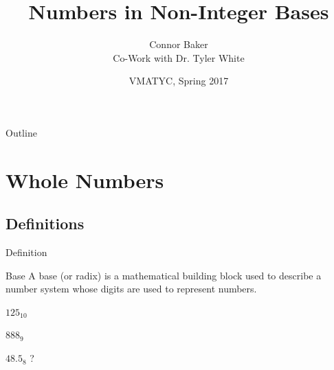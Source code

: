 \documentclass{beamer}
\title{Numbers in Non-Integer Bases}
\author[Connor Baker]{Connor Baker\\Co-Work with Dr. Tyler White}
\institute[NVCC]{Northern Virginia Community College} %
\date{VMATYC, Spring 2017}
\begin{document}
\begin{frame}
  \titlepage
\end{frame}

\begin{frame}{Outline}
  \tableofcontents
\end{frame}










\section{Whole Numbers}










\subsection{Definitions}
\begin{frame}{Definition}
  \begin{block}{Base}
    A base (or radix) is a mathematical building block used to describe a number system whose digits are used to represent numbers.
  \end{block}\pause

  \begin{example}\pause
    $125_{10}$ \pause

    $888_9$ \pause

    $48.5_8$ \pause ?
  \end{example}
\end{frame}
\end{document}
